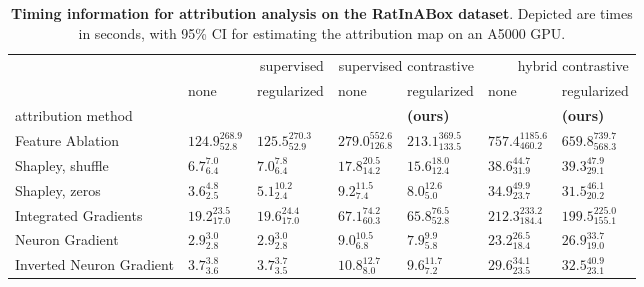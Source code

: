 \begin{table*}[ht]
    \centering
        \caption{\textbf{Timing information for attribution analysis on the RatInABox dataset}. Depicted are times in seconds, with 95\% CI for estimating the attribution map on an A5000 GPU.}
    \label{tbl:timing-scd}
    \small
    \begin{tabular}{lllllll}
    \toprule
 & \multicolumn{2}{r}{ supervised} & \multicolumn{2}{r}{ supervised contrastive} & \multicolumn{2}{r}{hybrid contrastive} \\
 & none & regularized & none & regularized & none & regularized \\
 attribution method &  &  &  &  \textbf{(ours)} &  &  \textbf{(ours)}\\
\midrule
Feature Ablation & $124.9_{52.8}^{268.9}$ & $125.5_{52.9}^{270.3}$ & $279.0_{126.8}^{552.6}$ & $213.1_{133.5}^{369.5}$ & $757.4_{460.2}^{1185.6}$ & $659.8_{568.3}^{739.7}$ \\
Shapley, shuffle & $6.7_{6.4}^{7.0}$ & $7.0_{6.4}^{7.8}$ & $17.8_{14.2}^{20.5}$ & $15.6_{12.4}^{18.0}$ & $38.6_{31.9}^{44.7}$ & $39.3_{29.1}^{47.9}$ \\
Shapley, zeros & $3.6_{2.5}^{4.8}$ & $5.1_{2.4}^{10.2}$ & $9.2_{7.4}^{11.5}$ & $8.0_{5.0}^{12.6}$ & $34.9_{23.7}^{49.9}$ & $31.5_{20.2}^{46.1}$ \\
Integrated Gradients & $19.2_{17.0}^{23.5}$ & $19.6_{17.0}^{24.4}$ & $67.1_{60.3}^{74.2}$ & $65.8_{52.8}^{76.5}$ & $212.3_{184.4}^{233.2}$ & $199.5_{155.1}^{225.0}$ \\
\midrule
Neuron Gradient & $2.9_{2.8}^{3.0}$ & $2.9_{2.8}^{3.0}$ & $9.0_{6.8}^{10.5}$ & $7.9_{5.8}^{9.9}$ & $23.2_{18.4}^{26.5}$ & $26.9_{19.0}^{33.7}$ \\
Inverted Neuron Gradient & $3.7_{3.6}^{3.8}$ & $3.7_{3.5}^{3.7}$ & $10.8_{8.0}^{12.7}$ & $9.6_{7.2}^{11.7}$ & $29.6_{23.5}^{34.1}$ & $32.5_{23.1}^{40.9}$ \\
\bottomrule
    \end{tabular} \\
    \end{table*}




